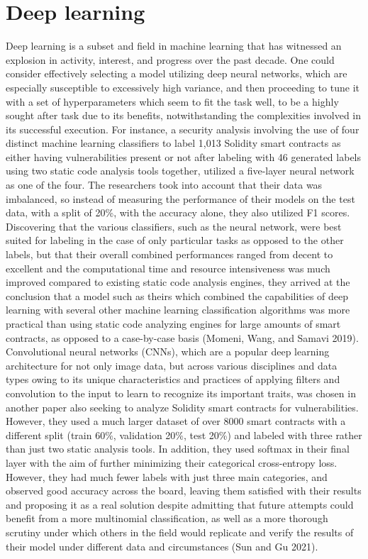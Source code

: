 \documentclass[
  11pt,
]{article}
\begin{document}
\hypertarget{deep-learning}{%
\section{Deep learning}\label{deep-learning}}

Deep learning is a subset and field in machine learning that has
witnessed an explosion in activity, interest, and progress over the past
decade. One could consider effectively selecting a model utilizing deep
neural networks, which are especially susceptible to excessively high
variance, and then proceeding to tune it with a set of hyperparameters
which seem to fit the task well, to be a highly sought after task due to
its benefits, notwithstanding the complexities involved in its
successful execution. For instance, a security analysis involving the
use of four distinct machine learning classifiers to label 1,013
Solidity smart contracts as either having vulnerabilities present or not
after labeling with 46 generated labels using two static code analysis
tools together, utilized a five-layer neural network as one of the four.
The researchers took into account that their data was imbalanced, so
instead of measuring the performance of their models on the test data,
with a split of 20\%, with the accuracy alone, they also utilized F1
scores. Discovering that the various classifiers, such as the neural
network, were best suited for labeling in the case of only particular
tasks as opposed to the other labels, but that their overall combined
performances ranged from decent to excellent and the computational time
and resource intensiveness was much improved compared to existing static
code analysis engines, they arrived at the conclusion that a model such
as theirs which combined the capabilities of deep learning with several
other machine learning classification algorithms was more practical than
using static code analyzing engines for large amounts of smart
contracts, as opposed to a case-by-case basis (Momeni, Wang, and Samavi
2019). Convolutional neural networks (CNNs), which are a popular deep
learning architecture for not only image data, but across various
disciplines and data types owing to its unique characteristics and
practices of applying filters and convolution to the input to learn to
recognize its important traits, was chosen in another paper also seeking
to analyze Solidity smart contracts for vulnerabilities. However, they
used a much larger dataset of over 8000 smart contracts with a different
split (train 60\%, validation 20\%, test 20\%) and labeled with three
rather than just two static analysis tools. In addition, they used
softmax in their final layer with the aim of further minimizing their
categorical cross-entropy loss. However, they had much fewer labels with
just three main categories, and observed good accuracy across the board,
leaving them satisfied with their results and proposing it as a real
solution despite admitting that future attempts could benefit from a
more multinomial classification, as well as a more thorough scrutiny
under which others in the field would replicate and verify the results
of their model under different data and circumstances (Sun and Gu 2021).
\end{document}
